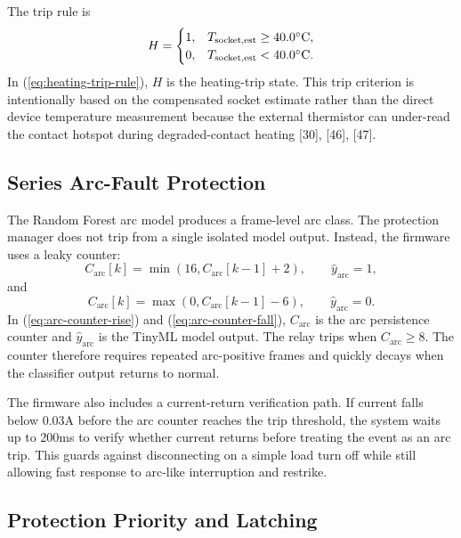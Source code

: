 The trip rule is
\begin{equation}
  H =
  \begin{cases}
  1, & T_{\mathrm{socket,est}}\geq 40.0^\circ\mathrm{C},\\
  0, & T_{\mathrm{socket,est}}<40.0^\circ\mathrm{C} .
  \end{cases}
  \label{eq:heating-trip-rule}
\end{equation}
In (\ref{eq:heating-trip-rule}), $H$ is the heating-trip state. This trip
criterion is intentionally based on the compensated socket estimate rather
than the direct device temperature measurement because the external thermistor can under-read the
contact hotspot during degraded-contact heating [30], [46], [47].

\subsection{Series Arc-Fault Protection}
\label{sec:ch3-arc-protection}

The Random Forest arc model produces a frame-level arc class. The protection
manager does not trip from a single isolated model output. Instead, the
firmware uses a leaky counter:
\begin{equation}
  C_{\mathrm{arc}}[k] =
  \min\left(16, C_{\mathrm{arc}}[k-1] + 2\right),
  \qquad \hat{y}_{\mathrm{arc}}=1,
  \label{eq:arc-counter-rise}
\end{equation}
and
\begin{equation}
  C_{\mathrm{arc}}[k] =
  \max\left(0, C_{\mathrm{arc}}[k-1] - 6\right),
  \qquad \hat{y}_{\mathrm{arc}}=0 .
  \label{eq:arc-counter-fall}
\end{equation}
In (\ref{eq:arc-counter-rise}) and (\ref{eq:arc-counter-fall}),
$C_{\mathrm{arc}}$ is the arc persistence counter and
$\hat{y}_{\mathrm{arc}}$ is the TinyML model output. The relay trips when
$C_{\mathrm{arc}}\geq 8$. The counter therefore requires repeated arc-positive
frames and quickly decays when the classifier output returns to normal.

The firmware also includes a current-return verification path. If current
falls below 0.03A before the arc counter reaches the trip threshold, the
system waits up to 200ms to verify whether current returns before treating the
event as an arc trip. This guards against disconnecting on a simple load turn
off while still allowing fast response to arc-like interruption and restrike.

\subsection{Protection Priority and Latching}
\label{sec:ch3-priority-latching}

